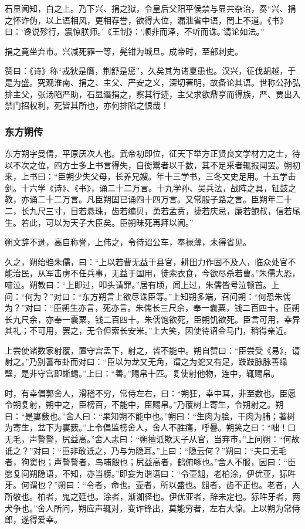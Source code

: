 \documentclass[]{article}
\begin{document}
石显闻知，白之上。乃下兴、捐之狱，令皇后父阳平侯禁与显共杂治，奏``兴、捐之怀诈伪，以上语相风，更相荐誉，欲得大位，漏泄省中语，罔上不道。《书》曰：`谗说殄行，震惊朕师。'《王制》：`顺非而泽，不听而诛。'请论如法。''

捐之竟坐弃市。兴减死罪一等，髡钳为城旦。成帝时，至部刺史。

赞曰：《诗》称``戎狄是膺，荆舒是惩''，久矣其为诸夏患也。汉兴，征伐胡越，于是为盛。究观淮南、捐之、主父、严安之义，深切著明，故备论其语。世称公孙弘排主父，张汤陷严助，石显谮捐之，察其行迹，主父求欲鼎亨而得族，严、贾出入禁门招权利，死皆其所也，亦何排陷之恨哉！

\hypertarget{header-n4922}{%
\subsubsection{东方朔传}\label{header-n4922}}

东方朔字曼倩，平原厌次人也。武帝初即位，征天下举方正贤良文学材力之士，待以不次之位，四方士多上书言得失，自衒鬻者以千数，其不足采者辄报闻罢。朔初来，上书曰：``臣朔少失父母，长养兄嫂。年十三学书，三冬文史足用。十五学击剑。十六学《诗》、《书》，诵二十二万言。十九学孙、吴兵法，战阵之具，钲鼓之教，亦诵二十二万言。凡臣朔固已诵四十四万言。又常服子路之言。臣朔年二十二，长九尺三寸，目若悬珠，齿若编贝，勇若孟贲，捷若庆忌，廉若鲍叔，信若尾生。若此，可以为天子大臣矣。臣朔昧死再拜以闻。''

朔文辞不逊，高自称誉，上伟之，令待诏公车，奉禄薄，未得省见。

久之，朔绐驺朱儒，曰：``上以若曹无益于县官，耕田力作固不及人，临众处官不能治民，从军击虏不任兵事，无益于国用，徒索衣食，今欲尽杀若曹。''朱儒大恐，啼泣。朔教曰：``上即过，叩头请罪。''居有顷，闻上过，朱儒皆号泣顿首。上问：``何为？''对曰：``东方朔言上欲尽诛臣等。''上知朔多端，召问朔：``何恐朱儒为？''对曰：``臣朔生亦言，死亦言。朱儒长三尺余，奉一囊粟，钱二百四十。臣朔长九尺余，亦奉一囊粟，钱二百四十。朱儒饱欲死，臣朔饥欲死。臣言可用，幸异其礼；不可用，罢之，无令但索长安米。''上大笑，因使待诏金马门，稍得亲近。

上尝使诸数家射覆，置守宫盂下，射之，皆不能中。朔自赞曰：``臣尝受《易》，请射之。''乃别蓍布卦而对曰：``臣以为龙又无角，谓之为蛇又有足，跂跂脉脉善缘壁，是非守宫即蜥蜴。''上曰：``善。''赐帛十匹。复使射他物，连中，辄赐帛。

时，有幸倡郭舍人，滑稽不穷，常侍左右，曰：``朔狂，幸中耳，非至数也。臣愿令朔复射，朔中之，臣榜百，不能中，臣赐帛。''乃覆树上寄生，令朔射之。朔曰：``是寠薮也。''舍人曰：``果知朔不能中也。''朔曰：``生肉为脍，干肉为脯；著树为寄生，盆下为寠薮。''上令倡监榜舍人，舍人不胜痛，呼謈。朔笑之曰：``咄！口无毛，声謷謷，尻益高。''舍人恚曰：``朔擅诋欺天子从官，当弃市。''上问朔：``何故诋之？''对曰：``臣非敢诋之，乃与为隐耳。''上曰：``隐云何？''朔曰：``夫口无毛者，狗窦也；声謷謷者，鸟哺鷇也；尻益高者，鹤俯啄也。''舍人不服，因曰：``臣愿复问朔隐语，不知，亦当榜。''即妄为谐语曰：``令壶龃，老柏涂，伊优亚，狋吽牙。何谓也？''朔曰：``令者，命也。壶者，所以盛也。龃者，齿不正也。老者，人所敬也。柏者，鬼之廷也。涂者，渐洳径也。伊优亚者，辞未定也。狋吽牙者，两犬争也。''舍人所问，朔应声辄对，变诈锋出，莫能穷者，左右大惊。上以朔为常侍郎，遂得爱幸。
\end{document}
